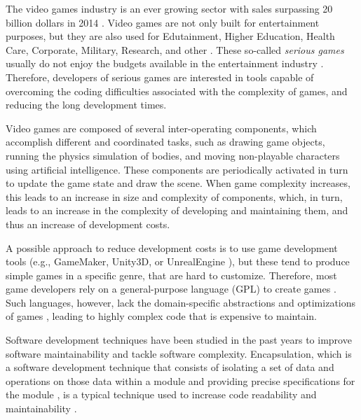 The video games industry is an ever growing sector with sales surpassing 20 billion dollars in 2014 \cite{game_sales_esa}. Video games are not only built for entertainment purposes, but they are also used for Edutainment, Higher Education, Health Care, Corporate, Military, Research, and other \cite{CMP_Media_2004,serious_games}. These so-called \textit{serious games} usually do not enjoy the budgets available in the entertainment industry \cite{stapleton2004serious}. Therefore, developers of serious games are interested in tools capable of overcoming the coding difficulties associated with the complexity of games, and reducing the long development times.

Video games are composed of several inter-operating components, which accomplish different and coordinated tasks, such as drawing game objects, running the physics simulation of bodies, and moving non-playable characters using artificial intelligence. These components are periodically activated in turn to update the game state and draw the scene. When game complexity increases, this leads to an increase in size and complexity of components, which, in turn, leads to an increase in the complexity of developing and maintaining them, and thus an increase of development costs.


A possible approach to reduce development costs is to use game development tools (e.g., GameMaker, Unity3D, or UnrealEngine \cite{petridis2010engine}), but these tend to produce simple games in a specific genre, that are hard to customize. Therefore, most game developers rely on a general-purpose language (GPL) to create games \cite{lewis2002game}. Such languages, however, lack the domain-specific abstractions and optimizations of games \cite{Rocki:2014:FAP:2554850.2555029,sujeeth2014delite}, leading to highly complex code that is expensive to maintain.

Software development techniques have been studied in the past years to improve software maintainability and tackle software complexity. Encapsulation, which is a software development technique that consists of isolating a set of data and operations on those data within a module and providing precise specifications for the module \cite{citeulike:10949855}, is a typical technique used to increase code readability and maintainability \cite{collar2006role}.



